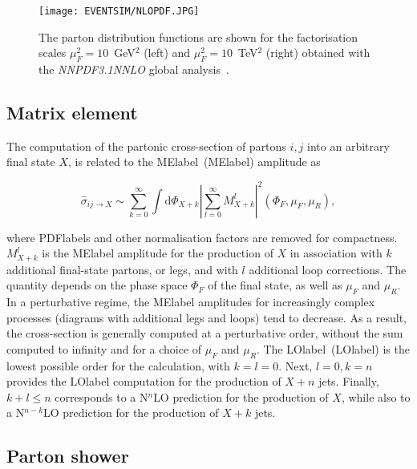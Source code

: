  \begin{figure}[hbtp]
    \RawFloats
    \begin{center}
    \texttt{[image: EVENTSIM/NLOPDF.JPG]}
    \caption{
        The parton distribution functions are shown for the factorisation scales $\mu_F^2=10$~GeV$^2$ (left) and $\mu_F^2=10$~TeV$^2$ (right) obtained with the \textit{NNPDF3.1NNLO} global analysis~\cite{Ball_2017}.}
    \label{figEVNTSIM:PDF}
    \end{center}
\end{figure}

\subsection{Matrix element}

The computation of the partonic cross-section of partons $i,j$ into an arbitrary final state $X$, is related to the \acrlong{MElabel}~(\acrshort{MElabel}) amplitude as

\begin{equation}
    \hat{\sigma}_{ij\to X} \sim \sum_{k=0}^{\infty} \int \text{d}\Phi_{X+k}\left|\sum_{l=0}^{\infty} M^l_{X+k}\right|^2(\Phi_F,\mu_F,\mu_R),
\end{equation}

where \acrshort{PDFlabel}s and other normalisation factors are removed for compactness. $M^l_{X+k}$ is the \acrshort{MElabel} amplitude for the production of $X$ in association with $k$ additional final-state partons, or legs, and with $l$ additional loop corrections. The quantity depends on the phase space $\Phi_F$ of the final state, as well as $\mu_F$ and $\mu_R$.\\

In a perturbative regime, the \acrshort{MElabel} amplitudes for increasingly complex processes (diagrams with additional legs and loops) tend to decrease. As a result, the cross-section is generally computed at a perturbative order, without the sum computed to infinity and for a choice of $\mu_F$ and $\mu_R$. The \acrlong{LOlabel}~(\acrshort{LOlabel}) is the lowest possible order for the calculation, with $k=l=0$. Next, $l=0,k=n$ provides the \acrshort{LOlabel} computation for the production of $X+n$ jets. Finally, $k+l\leq n$ corresponds to a N$^n$LO prediction for the production of $X$, while also to a N$^{n-k}$LO prediction for the production of $X+k$ jets.

\subsection{Parton shower}

